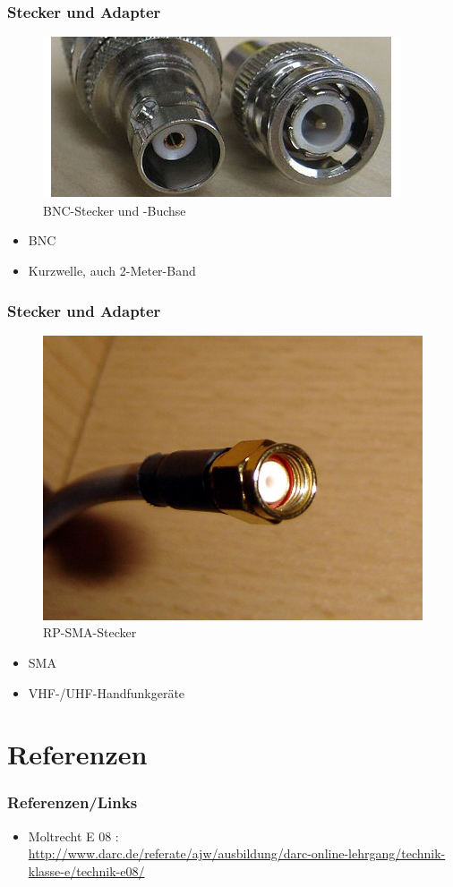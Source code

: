 \begin{frame}
\frametitle{Stecker und Adapter}
\begin{center}
  \begin{figure}
	\includegraphics[width=.6\textwidth,height=.7\textheight,keepaspectratio]{e10/bnc.jpg}
	\caption{BNC-Stecker und -Buchse\cite{bnc}}
      \end{figure}
	\begin{itemize}
		\item BNC
		\item Kurzwelle, auch 2-Meter-Band
	\end{itemize}	

\end{center}
\end{frame}

\begin{frame}
\frametitle{Stecker und Adapter}
\begin{center}
  \begin{figure}
	\includegraphics[width=.6\textwidth,height=.6\textheight,keepaspectratio]{e10/sma.jpg}
	\caption{RP-SMA-Stecker\cite{sma}}
      \end{figure}
	\begin{itemize}
		\item SMA
		\item VHF-/UHF-Handfunkgeräte
	\end{itemize}	 
\end{center}
\end{frame}

\section*{Referenzen}
\begin{frame}
    \frametitle{Referenzen/Links}
    
    \footnotesize
    \begin{itemize}
        \item Moltrecht E 08 : \\
              \url{http://www.darc.de/referate/ajw/ausbildung/darc-online-lehrgang/technik-klasse-e/technik-e08/}      
    \end{itemize}

\end{frame}

